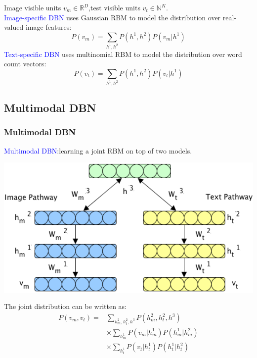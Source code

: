 \documentclass{beamer}
\begin{document}
\begin{CJK*}{UTF8}{gbsn}
\begin{frame}[allowframebreaks]
\newpage
Image visible units $v_m\in \mathbb{R}^D$,test visible units $v_t\in \mathbb{N}^K$.\\
\textcolor{blue}{Image-specific DBN} uses Gaussian RBM to model the distribution over real-valued image features:
\begin{equation}
P(v_m)=\sum_{h^1,h^2}P(h^1,h^2)P(v_m|h^1)
\end{equation}
\textcolor{blue}{Text-specific DBN} uses multinomial RBM to model the distribution over word count vectors:
\begin{equation}
P(v_t)=\sum_{h^1,h^2}P(h^1,h^2)P(v_t|h^1)
\end{equation}
\end{frame}

\newpage
\subsection{Multimodal DBN}
\begin{frame}\frametitle{Multimodal DBN}
\textcolor{blue}{Multimodal DBN}:learning a joint RBM on top of two models.\\
\begin{center}
\includegraphics[scale=0.14]{images/multimodal}
\end{center}
The joint distribution can be written as:
\begin{equation}
\begin{split}
P(v_m,v_t)=&\sum_{h_m^2,h_t^2,h^3}P(h_m^2,h_t^2,h^3)\\
&\times \sum_{h_m^1}P(v_m|h_m^1)P(h_m^1|h_m^2)\\
&\times \sum_{h_t^1}P(v_t|h_t^1)P(h_t^1|h_t^2)
\end{split}
\end{equation}
\end{frame}


\end{CJK*}
\end{document}
